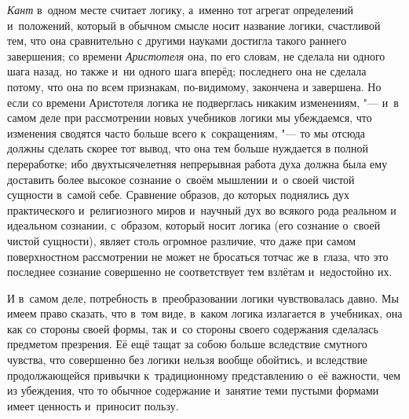 {\em Кант} в~одном месте
считает логику, а~именно тот агрегат определений и~положений, который в
обычном смысле носит название логики, счастливой тем, что она сравнительно
с другими науками достигла такого раннего завершения; со времени
{\em Аристотеля} она, по его словам, не сделала ни
одного шага назад, но также и~ни одного шага вперёд; последнего она не
сделала потому, что она по всем признакам, по-видимому, закончена и
завершена. Но если со времени Аристотеля логика не подверглась никаким
изменениям, "--- и~в самом деле при рассмотрении новых учебников логики мы
убеждаемся, что изменения сводятся часто больше всего к~сокращениям, "--- то
мы отсюда должны сделать скорее тот вывод, что она тем больше нуждается в
полной переработке; ибо двухтысячелетняя непрерывная работа духа должна
была ему доставить более высокое сознание о~своём мышлении и~о своей чистой
сущности в~самой себе. Сравнение образов, до которых поднялись дух
практического и~религиозного миров и~научный дух во всякого рода реальном и
идеальном сознании, с~образом, который носит логика (его сознание о~своей
чистой сущности), являет столь огромное различие, что даже при самом
поверхностном рассмотрении не может не бросаться тотчас же в~глаза, что это
последнее сознание совершенно не соответствует тем взлётам и~недостойно их.

И в~самом деле, потребность в~преобразовании логики чувствовалась давно. Мы
имеем право сказать, что в~том виде, в~каком логика излагается в~учебниках,
она как со стороны своей формы, так и~со стороны своего содержания
сделалась предметом презрения. Её ещё тащат за собою больше вследствие
смутного чувства, что совершенно без логики нельзя вообще обойтись, и
вследствие продолжающейся привычки к~традиционному представлению о~её
важности, чем из убеждения, что то обычное содержание и~занятие теми
пустыми формами имеет ценность и~приносит пользу.


